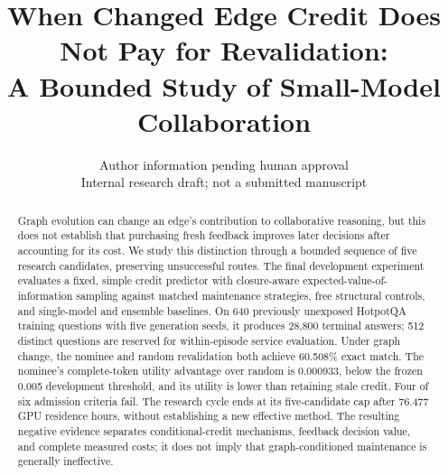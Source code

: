\documentclass[11pt]{article}
\title{When Changed Edge Credit Does Not Pay for Revalidation:\\A Bounded Study of Small-Model Collaboration}
\author{Author information pending human approval\\Internal research draft; not a submitted manuscript}
\begin{document}
\maketitle
\begin{abstract}
Graph evolution can change an edge's contribution to collaborative reasoning,
but this does not establish that purchasing fresh feedback improves later
decisions after accounting for its cost. We study this distinction through
a bounded sequence of five research candidates, preserving unsuccessful
routes. The final development experiment evaluates a fixed, simple
credit predictor with closure-aware expected-value-of-information sampling
against matched maintenance strategies, free structural controls, and
single-model and ensemble baselines. On 640 previously unexposed HotpotQA
training questions with five generation seeds, it produces 28,800 terminal
answers; 512 distinct questions are reserved for within-episode service
evaluation. Under graph change, the nominee and random revalidation both
achieve 60.508\% exact match. The nominee's complete-token utility advantage
over random is 0.000933, below the frozen 0.005 development threshold,
and its utility is lower than retaining stale credit. Four of six admission
criteria fail. The research cycle ends at its five-candidate cap after
76.477 GPU residence hours, without establishing a new effective method.
The resulting negative evidence separates conditional-credit mechanisms,
feedback decision value, and complete measured costs; it does not imply
that graph-conditioned maintenance is generally ineffective.
\end{abstract}









\clearpage
\appendix


\end{document}
